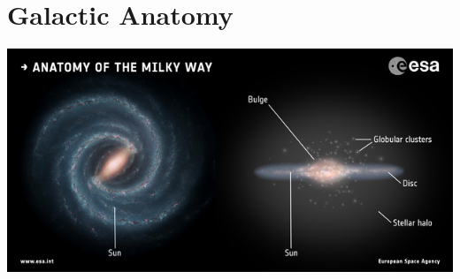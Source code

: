 \section{Galactic Anatomy}
\begin{center} \includegraphics[scale=2]{galaxies/anatomy/pic} \end{center}
